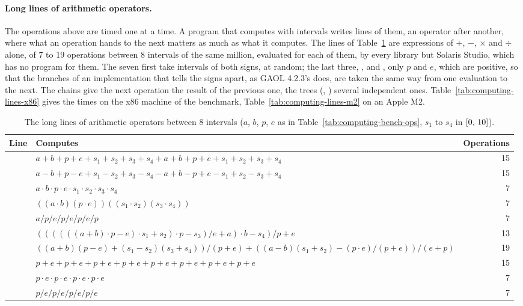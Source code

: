 \documentclass[12pt,a4paper,twoside,openright]{book}
\begin{document}
\paragraph{Long lines of arithmetic operators.}
The operations above are timed one at a time. A program that computes with
intervals writes lines of them, an operator after another, where what an
operation hands to the next matters as much as what it computes. The lines
of Table~\ref{tab:computing-lines} are expressions of $+$, $-$, $\times$
and $\div$ alone, of 7 to 19 operations between 8 intervals of the same
million, evaluated for each of them, by every library but Solaris Studio,
which has no program for them. The seven first take intervals of both
signs, at random; the last three, ,  and
, only $p$ and $e$, which are positive, so that the
branches of an implementation that tells the signs apart, as GAOL 4.2.3's
does, are taken the same way from one evaluation to the next. The chains
give the next operation the result of the previous one, the trees
(, ) several independent ones.
Table~\ref{tab:computing-lines-x86} gives the times on the x86 machine of
the benchmark, Table~\ref{tab:computing-lines-m2} on an Apple M2.

\begin{table}[htbp]
\centering\footnotesize
\begin{tabular}{|l|L{9.0cm}|r|}
\hline
\textbf{Line} & \textbf{Computes} & \textbf{Operations} \\
\hline
{} & $a + b + p + e + s_1 + s_2 + s_3 + s_4 + a + b + p + e + s_1
+ s_2 + s_3 + s_4$ & 15 \\
 & $a - b + p - e + s_1 - s_2 + s_3 - s_4 - a + b - p + e - s_1
+ s_2 - s_3 + s_4$ & 15 \\
 & $a \cdot b \cdot p \cdot e \cdot s_1 \cdot s_2 \cdot s_3 \cdot
s_4$ & 7 \\
 & $((a \cdot b)(p \cdot e))((s_1 \cdot s_2)(s_3 \cdot
s_4))$ & 7 \\
 & $a / p / e / p / e / p / e / p$ & 7 \\
 & $((((((a + b) \cdot p - e) \cdot s_1 + s_2) \cdot p - s_3) /
e + a) \cdot b - s_4) / p + e$ & 13 \\
 & $((a + b)(p - e) + (s_1 - s_2)(s_3 + s_4)) / (p + e) +
((a - b)(s_1 + s_2) - (p \cdot e) / (p + e)) / (e + p)$ & 19 \\
 & $p + e + p + e + p + e + p + e + p + e + p + e + p + e
+ p + e$ & 15 \\
 & $p \cdot e \cdot p \cdot e \cdot p \cdot e \cdot p \cdot
e$ & 7 \\
 & $p / e / p / e / p / e / p / e$ & 7 \\
\hline
\end{tabular}
\caption[The long lines of arithmetic operators between 8 intervals]{The long lines of arithmetic operators between 8 intervals ($a$,
$b$, $p$, $e$ as in Table~\ref{tab:computing-bench-ops}, $s_1$ to $s_4$ in
$\itv{0}{10}$).}
\label{tab:computing-lines}
\end{table}
\end{document}

